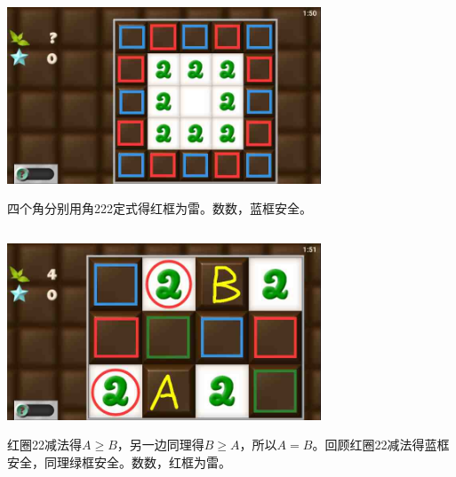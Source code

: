 \subsection{} %
\begin{center}
    \includegraphics[width=0.7\textwidth]{puzzlelow/47-1.jpg}
\end{center}
四个角分别用角222定式得红框为雷。数数，蓝框安全。

\subsection{} %
\begin{center}
    \includegraphics[width=0.7\textwidth]{puzzlelow/48-1.jpg}
\end{center}
红圈22减法得$A\ge B$，另一边同理得$B\ge A$，所以$A=B$。回顾红圈22减法得蓝框安全，同理绿框安全。数数，红框为雷。

